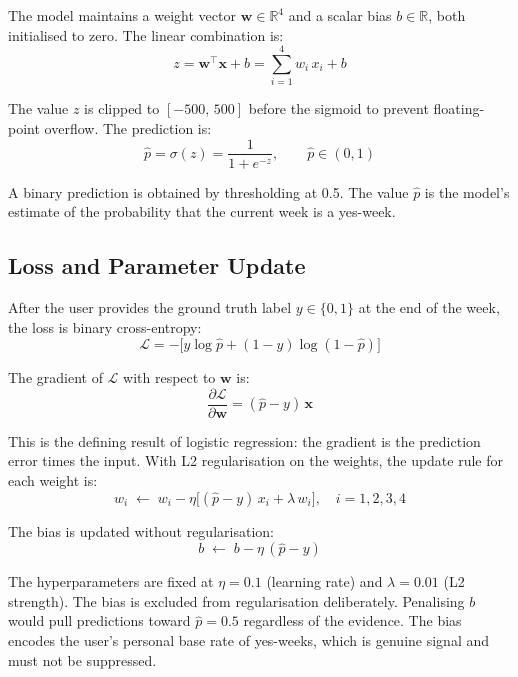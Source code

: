 \documentclass[11pt, a4paper]{report}
\begin{document}
The model maintains a weight vector $\mathbf{w} \in \mathbb{R}^4$ and
a scalar bias $b \in \mathbb{R}$, both initialised to zero. The linear
combination is:
\begin{equation}
  z = \mathbf{w}^\top \mathbf{x} + b
    = \sum_{i=1}^{4} w_i\, x_i + b
\end{equation}

The value $z$ is clipped to $[-500,\, 500]$ before the sigmoid to prevent
floating-point overflow. The prediction is:
\begin{equation}
  \hat{p} = \sigma(z) = \frac{1}{1 + e^{-z}}, \qquad \hat{p} \in (0,1)
\end{equation}

A binary prediction is obtained by thresholding at 0.5. The value
$\hat{p}$ is the model's estimate of the probability that the current
week is a yes-week.

\subsection{Loss and Parameter Update}

After the user provides the ground truth label $y \in \{0, 1\}$ at the
end of the week, the loss is binary cross-entropy:
\begin{equation}
  \mathcal{L}
  = -\bigl[y \log\hat{p} + (1-y)\log(1-\hat{p})\bigr]
\end{equation}

The gradient of $\mathcal{L}$ with respect to $\mathbf{w}$ is:
\begin{equation}
  \frac{\partial \mathcal{L}}{\partial \mathbf{w}}
  = (\hat{p} - y)\,\mathbf{x}
\end{equation}

This is the defining result of logistic regression: the gradient is the
prediction error times the input. With L2 regularisation on the weights,
the update rule for each weight is:
\begin{equation}
  w_i \;\leftarrow\; w_i
  - \eta\bigl[(\hat{p} - y)\,x_i + \lambda\, w_i\bigr],
  \quad i = 1,2,3,4
\end{equation}

The bias is updated without regularisation:
\begin{equation}
  b \;\leftarrow\; b - \eta\,(\hat{p} - y)
\end{equation}

The hyperparameters are fixed at $\eta = 0.1$ (learning rate) and
$\lambda = 0.01$ (L2 strength). The bias is excluded from regularisation
deliberately. Penalising $b$ would pull predictions toward $\hat{p} = 0.5$
regardless of the evidence. The bias encodes the user's personal base
rate of yes-weeks, which is genuine signal and must not be suppressed.
\end{document}

